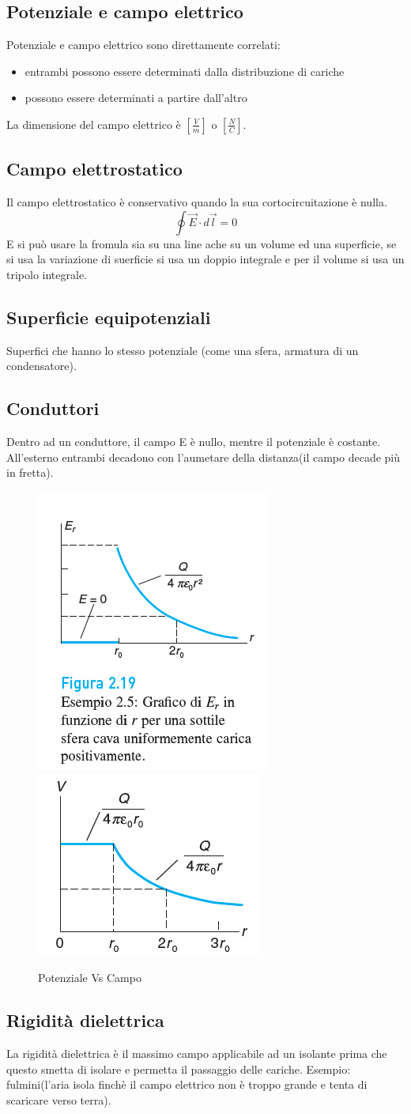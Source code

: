 \subsection{Potenziale e campo elettrico}
Potenziale e campo elettrico sono direttamente correlati:
\begin{itemize}
    \item entrambi possono essere determinati dalla distribuzione di cariche
    \item possono essere determinati a partire dall'altro
\end{itemize}

La dimensione del campo elettrico è $[\frac{V}{m}]$ o $[\frac{N}{C}]$.

\subsection{Campo elettrostatico}
Il campo elettrostatico è conservativo quando la sua cortocircuitazione è nulla.
\begin{equation*}
    \oint{\vec{E}\cdot d\vec{l}} = 0
\end{equation*}
E si può usare la fromula sia su una line ache su un volume ed una superficie,
se si usa la variazione di suerficie si usa un doppio integrale e
per il volume si usa un tripolo integrale.

\subsection{Superficie equipotenziali}
Superfici che hanno lo stesso potenziale
(come una sfera, armatura di un condensatore).

\subsection{Conduttori}
Dentro ad un conduttore, il campo E è nullo, mentre il potenziale è costante.
All'esterno entrambi decadono con l'aumetare della distanza(il campo decade più in fretta).

\begin{figure}[H]
    \centering
    \includegraphics[width=0.25\linewidth]{imgs/10 - campo vs potenziale.png}
    \includegraphics[width=0.25\linewidth]{imgs/11 - campo vs potenziale2.png}
    \caption{Potenziale Vs Campo}
    \label{fig:potenziale_vs_campo}
\end{figure}

\subsection{Rigidità dielettrica}
La rigidità dielettrica è il massimo campo applicabile ad un isolante prima che questo
smetta di isolare e permetta il passaggio delle cariche.
Esempio: fulmini(l'aria isola finchè il campo elettrico non è troppo grande
e tenta di scaricare verso terra).